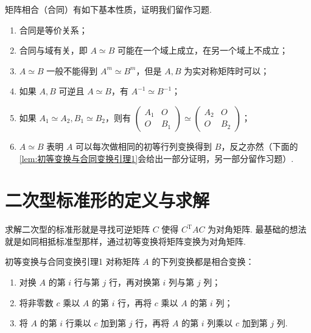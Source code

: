 矩阵相合（合同）有如下基本性质，证明我们留作习题.

\begin{enumerate}
    \item 合同是等价关系；

    \item 合同与域有关，即 $A \simeq B$ 可能在一个域上成立，在另一个域上不成立；

    \item $A \simeq B$ 一般不能得到 $A^m \simeq B^m$，但是 $A, B$ 为实对称矩阵时可以；

    \item 如果 $A, B$ 可逆且 $A \simeq B$，有 $A^{-1} \simeq B^{-1}$；

    \item 如果 $A_1\simeq A_2,B_1\simeq B_2$，则有 $\begin{pmatrix}
                  A_1 & O \\ O & B_1
              \end{pmatrix}\simeq\begin{pmatrix}
                  A_2 & O \\ O & B_2
              \end{pmatrix}$；

    \item $A \simeq B$ 表明 $A$ 可以每次做相同的初等行列变换得到 $B$，反之亦然（下面的\autoref{lem:初等变换与合同变换引理1}会给出一部分证明，另一部分留作习题）.
\end{enumerate}

\section{二次型标准形的定义与求解}

求解二次型的标准形就是寻找可逆矩阵 $C$ 使得 $C^\mathrm{T}AC$ 为对角矩阵. 最基础的想法就是如同相抵标准型那样，通过初等变换将矩阵变换为对角矩阵.

\begin{lemma}{}{初等变换与合同变换引理1}
    对称矩阵 $A$ 的下列变换都是相合变换：
    \begin{enumerate}
        \item 对换 $A$ 的第 $i$ 行与第 $j$ 行，再对换第 $i$ 列与第 $j$ 列；

        \item 将非零数 $c$ 乘以 $A$ 的第 $i$ 行，再将 $c$ 乘以 $A$ 的第 $i$ 列；

        \item 将 $A$ 的第 $i$ 行乘以 $c$ 加到第 $j$ 行，再将 $A$ 的第 $i$ 列乘以 $c$ 加到第 $j$ 列.
    \end{enumerate}
\end{lemma}

